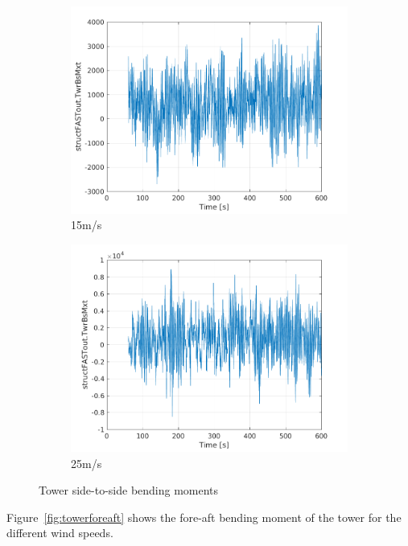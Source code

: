 \documentclass[10pt]{article}
\begin{document}
\begin{figure}[H]
\begin{subfigure}{0.40\textwidth}
  \includegraphics[width=1\linewidth]{../CIP_6/FAST/Plots_ws15/TwrBsMxt.png}
  \caption{15m/s}
\end{subfigure}
\begin{subfigure}{0.40\textwidth}
  \includegraphics[width=1\linewidth]{../CIP_6/FAST/Plots_ws25/TwrBsMxt.png}
  \caption{25m/s}
\end{subfigure}
\caption{Tower side-to-side bending moments}
\label{fig:towersideside}
\end{figure}

Figure~\ref{fig:towerforeaft} shows the fore-aft bending moment of the tower for the different wind speeds.
\end{document}
